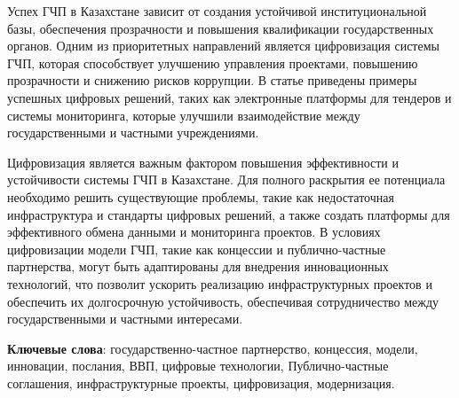 Успех ГЧП в Казахстане зависит от создания устойчивой институциональной
базы, обеспечения прозрачности и повышения квалификации государственных
органов. Одним из приоритетных направлений является цифровизация системы
ГЧП, которая способствует улучшению управления проектами, повышению
прозрачности и снижению рисков коррупции. В статье приведены примеры
успешных цифровых решений, таких как электронные платформы для тендеров
и системы мониторинга, которые улучшили взаимодействие между
государственными и частными учреждениями.

Цифровизация является важным фактором повышения эффективности и
устойчивости системы ГЧП в Казахстане. Для полного раскрытия ее
потенциала необходимо решить существующие проблемы, такие как
недостаточная инфраструктура и стандарты цифровых решений, а также
создать платформы для эффективного обмена данными и мониторинга
проектов. В условиях цифровизации модели ГЧП, такие как концессии и
публично-частные партнерства, могут быть адаптированы для внедрения
инновационных технологий, что позволит ускорить реализацию
инфраструктурных проектов и обеспечить их долгосрочную устойчивость,
обеспечивая сотрудничество между государственными и частными интересами.

{\bfseries Ключевые слова}: государственно-частное партнерство, концессия,
модели, инновации, послания, ВВП, цифровые технологии, Публично-частные
соглашения, инфраструктурные проекты, цифровизация, модернизация.

